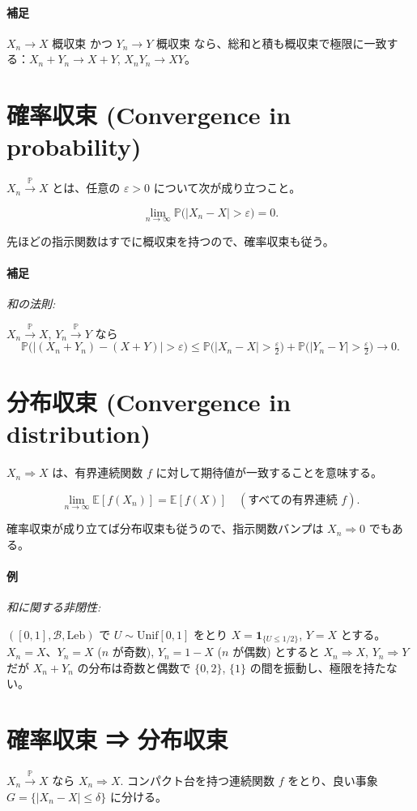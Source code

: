 \documentclass[uplatex,dvipdfmx,11pt,a4paper,openany]{bxjsbook}
\begin{document}
\paragraph{補足}
$X_n \to X$ 概収束 かつ $Y_n \to Y$ 概収束 なら、総和と積も概収束で極限に一致する：$X_n+Y_n \to X+Y$, $X_nY_n \to XY$。


\section{確率収束 (Convergence in probability)}
$X_n \xrightarrow{\mathbb P} X$ とは、任意の $\varepsilon>0$ について次が成り立つこと。

\[\lim_{n\to\infty} \mathbb P\big(|X_n - X| > \varepsilon\big) = 0.\]

先ほどの指示関数はすでに概収束を持つので、確率収束も従う。

\paragraph{補足}
\emph{和の法則:}

$X_n \xrightarrow{\mathbb P} X$, $Y_n \xrightarrow{\mathbb P} Y$ なら \[\mathbb P\big(|(X_n+Y_n)-(X+Y)|>\varepsilon\big) \le \mathbb P\big(|X_n-X|>\tfrac{\varepsilon}{2}\big) + \mathbb P\big(|Y_n-Y|>\tfrac{\varepsilon}{2}\big) \to 0.\]


\section{分布収束 (Convergence in distribution)}
$X_n \Rightarrow X$ は、有界連続関数 $f$ に対して期待値が一致することを意味する。

\[\lim_{n\to\infty} \mathbb E[f(X_n)] = \mathbb E[f(X)] \quad (\text{すべての有界連続 } f).\]

確率収束が成り立てば分布収束も従うので、指示関数バンプは $X_n \Rightarrow 0$ でもある。

\paragraph{例}
\emph{和に関する非閉性:}

$([0,1], \mathcal B, \text{Leb})$ で $U \sim \text{Unif}[0,1]$ をとり $X = \mathbf 1_{\{U \le 1/2\}}$, $Y=X$ とする。$X_n = X$、$Y_n = X$ ($n$ が奇数), $Y_n = 1-X$ ($n$ が偶数) とすると $X_n \Rightarrow X$, $Y_n \Rightarrow Y$ だが $X_n+Y_n$ の分布は奇数と偶数で $\{0,2\}$, $\{1\}$ の間を振動し、極限を持たない。


\section{確率収束 ⇒ 分布収束}
$X_n \xrightarrow{\mathbb P} X$ なら $X_n \Rightarrow X$. コンパクト台を持つ連続関数 $f$ をとり、良い事象 $G = \{|X_n-X| \le \delta\}$ に分ける。
\end{document}

